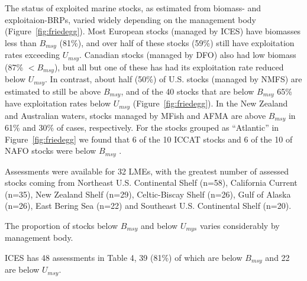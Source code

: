 The status of exploited marine stocks, as estimated from biomass- and
exploitaion-BRPs, varied widely depending on the management body
(Figure~\ref{fig:friedegg}). Most European stocks (managed by
ICES) have biomasses less than $B_{msy}$
(81\%), and over half of these
stocks (59\%) still
have exploitation rates exceeding $U_{msy}$. Canadian stocks (managed
by DFO) also had low biomass (87\%
$< B_{msy}$), but all but one of these has had its exploitation rate
reduced below $U_{msy}$. In contrast, about half
(50\%) of U.S. stocks (managed by
NMFS) are estimated to still be above $B_{msy}$, and of the
40 stocks that are below $B_{msy}$
65\% have exploitation
rates below $U_{msy}$ (Figure~\ref{fig:friedegg}). In the New
Zealand and Australian waters, stocks managed by MFish and AFMA are
above $B_{msy}$ in 61\% and
30\% of cases, respectively. For
the stocks grouped as ``Atlantic'' in Figure~\ref{fig:friedegg} we
found that 6 of the
10 ICCAT stocks and
6 of the
10 of NAFO stocks were below $B_{msy}$ .



Assessments were available for 32 LMEs, with the greatest number of
assessed stocks coming from Northeast U.S. Continental Shelf (n=58),
California Current (n=35), New Zealand Shelf (n=29),
Celtic-Biscay Shelf (n=26), Gulf of Alaska (n=26), East Bering Sea (n=22)
and Southeast U.S. Continental Shelf (n=20).

The proportion of stocks below $B_{msy}$ and below $U_{mys}$ varies considerably by management body. 

ICES has 48 assessments in Table 4,
39
(81\%) of which are below
$B_{msy}$ and 22 are below
$U_{msy}$.
